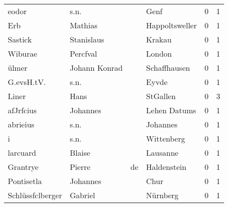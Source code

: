 \begin{tabular}{llllrr}
                    eodor &                               s.n. &             &                                        Genf &          0 &         1 \\
                      Erb &                            Mathias &             &                              Happoltsweller &          0 &         1 \\
                  Sastick &                         Stanislaus &             &                                      Krakau &          0 &         1 \\
                  Wiburae &                           Percfval &             &                                      London &          0 &         1 \\
                    ülmer &                      Johann Konrad &             &                                Schaffhausen &          0 &         1 \\
               G.evsH.tV. &                               s.n. &             &                                       Eyvde &          0 &         1 \\
                    Liner &                               Hans &             &                                    StGallen &          0 &         3 \\
                afJrfcius &                           Johannes &             &                                Lehen Datums &          0 &         1 \\
                 abrieius &                               s.n. &             &                                    Johannes &          0 &         1 \\
                        i &                               s.n. &             &                                  Wittenberg &          0 &         1 \\
                 larcuard &                             Blaise &             &                                    Lausanne &          0 &         1 \\
                 Grantrye &                             Pierre &          de &                                 Haldenstein &          0 &         1 \\
               Pontisetla &                           Johannes &             &                                        Chur &          0 &         1 \\
         Schlüssfclberger &                            Gabriel &             &                                    Nürnberg &          0 &         1 \\

\end{tabular}
